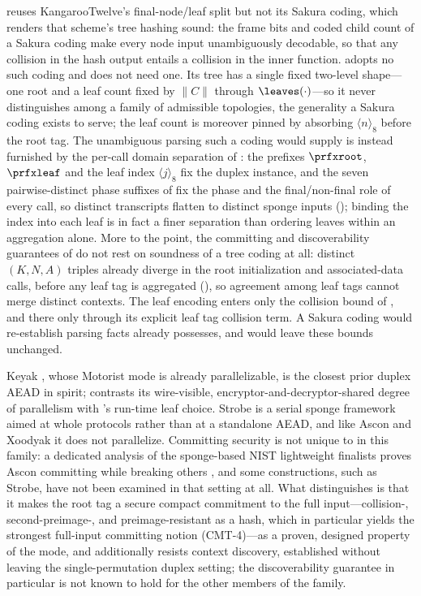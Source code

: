 \TW{} reuses KangarooTwelve's final-node/leaf split but not its Sakura coding,
which renders that scheme's tree hashing sound: the frame bits and coded child
count of a Sakura coding make every node input unambiguously decodable, so that
any collision in the hash output entails a collision in the inner function. \TW{}
adopts no such coding and does not need one. Its tree has a single fixed
two-level shape---one root and a leaf count fixed by $\|C\|$ through
$\leaves(\cdot)$---so it never distinguishes among a family of admissible
topologies, the generality a Sakura coding exists to serve; the leaf count is
moreover pinned by absorbing $\langle n \rangle_8$ before the root tag. The
unambiguous parsing such a coding would supply is instead furnished by the
per-call domain separation of : the prefixes $\prfxroot$,
$\prfxleaf$ and the leaf index $\langle j \rangle_8$ fix the duplex instance, and
the seven pairwise-distinct phase suffixes of  fix the phase
and the final/non-final role of every call, so distinct transcripts flatten to
distinct sponge inputs (); binding the
index into each leaf is in fact a finer separation than ordering leaves within an
aggregation alone. More to the point, the committing and discoverability
guarantees of  do not rest on soundness of a tree coding at all:
distinct $(K, N, A)$ triples already diverge in the root initialization and
associated-data calls, before any leaf tag is aggregated (),
so agreement among leaf tags cannot merge distinct contexts. The leaf encoding
enters only the collision bound of , and there only
through its explicit leaf tag collision term. A Sakura coding would re-establish
parsing facts \TW{} already possesses, and would leave these bounds unchanged.

Keyak \cite{BDPVV16}, whose Motorist mode is already parallelizable, is the
closest prior duplex AEAD in spirit;  contrasts its
wire-visible, encryptor-and-decryptor-shared degree of parallelism with \TW{}'s
run-time leaf choice.
Strobe \cite{Ham17} is a serial sponge framework aimed at whole protocols rather
than at a standalone AEAD, and like Ascon and Xoodyak it does not parallelize.
Committing security is not unique to \TW{} in this family: a dedicated analysis
of the sponge-based NIST lightweight finalists proves Ascon committing while
breaking others \cite{KSW23}, and some constructions, such as Strobe, have not
been examined in that setting at all. What distinguishes \TW{} is that it makes
the root tag a secure compact commitment to the full input---collision-,
second-preimage-, and preimage-resistant as a hash, which in particular yields
the strongest full-input committing notion (\textsf{CMT-4})---as a proven,
designed property of the mode, and additionally resists \cite{MLGR23} context
discovery, established without leaving the single-permutation duplex
setting; the discoverability guarantee in particular is not known to hold for
the other members of the family.

